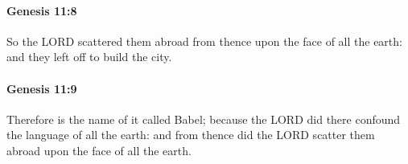 		\paragraph{Genesis 11:8} %
			\label{GENESIS-11-8}

			So the LORD scattered them abroad from thence upon the face of all the earth: and they left off to build the city.


		\paragraph{Genesis 11:9} %
			\label{GENESIS-11-9}

			Therefore is the name of it called Babel; because the LORD did there confound the language of all the earth: and from thence did the LORD scatter them abroad upon the face of all the earth.


